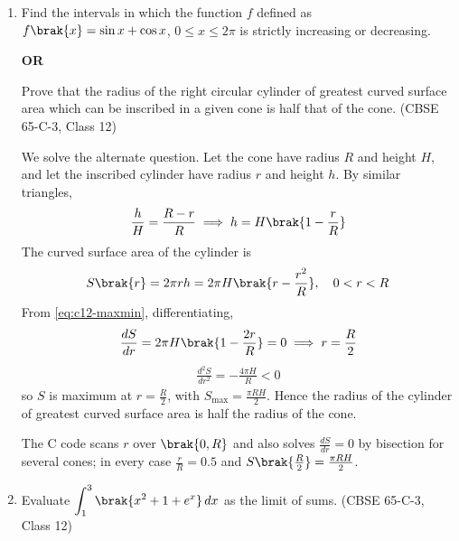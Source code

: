 \begin{enumerate}[label=\thesubsection.\arabic*., ref=\thesubsection.\theenumi]
\begin{center}
\end{center}
 
\item Find the intervals in which the function $f$ defined as $f\brak{x}=\sin x+\cos x$, $0\le x\le 2\pi$ is strictly increasing or decreasing.
\begin{center}\textbf{OR}\end{center}
Prove that the radius of the right circular cylinder of greatest curved surface area which can be inscribed in a given cone is half that of the cone.
\hfill (CBSE 65-C-3, Class 12)
 
\solution
We solve the alternate question. Let the cone have radius $R$ and height $H$, and let the inscribed cylinder have radius $r$ and height $h$. By similar triangles,
\begin{align}
\frac{h}{H} = \frac{R-r}{R}
\implies h = H\brak{1-\frac{r}{R}}
\end{align}
The curved surface area of the cylinder is
\begin{align}
S\brak{r} = 2\pi rh = 2\pi H\brak{r-\frac{r^2}{R}},\quad 0<r<R
\end{align}
From \eqref{eq:c12-maxmin}, differentiating,
\begin{align}
\frac{dS}{dr} = 2\pi H\brak{1-\frac{2r}{R}} = 0
\implies r=\frac{R}{2}
\end{align}
\begin{align}
\frac{d^2S}{dr^2} = -\frac{4\pi H}{R} < 0
\end{align}
so $S$ is maximum at $r=\frac{R}{2}$, with $S_{\max}=\frac{\pi RH}{2}$. Hence the radius of the cylinder of greatest curved surface area is half the radius of the cone.
 
The C code scans $r$ over $\brak{0,R}$ and also solves $\frac{dS}{dr}=0$ by bisection for several cones; in every case $\frac{r}{R}=0.5$ and $S\brak{\frac{R}{2}}=\frac{\pi RH}{2}$.
 
\begin{center}
\end{center}
\item Evaluate $\displaystyle\int_1^3\brak{x^2+1+e^x}\,dx$ as the limit of sums.
\hfill (CBSE 65-C-3, Class 12)
 

\end{enumerate}

